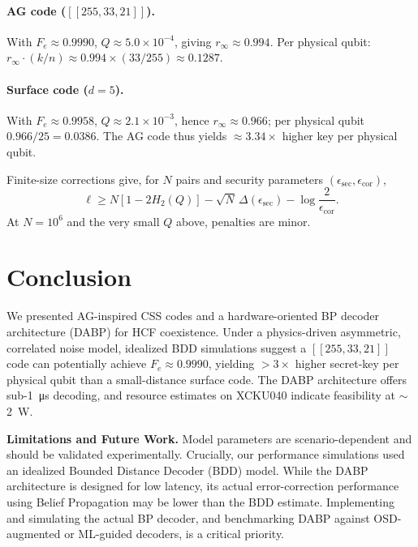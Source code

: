 \documentclass[conference]{IEEEtran}
\begin{document}
\paragraph*{AG code (\( [[255,33,21]] \)).}
With \(F_e\approx0.9990\), \(Q\approx5.0\times10^{-4}\), giving \(r_\infty\approx0.994\). Per physical qubit: \(r_\infty\cdot (k/n)\approx 0.994\times(33/255)\approx 0.1287\).

\paragraph*{Surface code (\(d=5\)).}
With \(F_e\approx0.9958\), \(Q\approx2.1\times10^{-3}\), hence \(r_\infty\approx0.966\); per physical qubit \(0.966/25=0.0386\). The AG code thus yields \(\approx3.34\times\) higher key per physical qubit.

Finite-size corrections give, for \(N\) pairs and security parameters \((\epsilon_{\mathrm{sec}},\epsilon_{\mathrm{cor}})\),
\begin{equation}
\ell \ge N\!\left[1-2H_2(Q)\right]-\sqrt{N}\,\Delta(\epsilon_{\mathrm{sec}})-\log\frac{2}{\epsilon_{\mathrm{cor}}}.
\end{equation}
At \(N=10^6\) and the very small \(Q\) above, penalties are minor.

\section{Conclusion}\label{sec:conclusion}
We presented AG-inspired CSS codes and a hardware-oriented BP decoder architecture (DABP) for HCF coexistence. Under a physics-driven asymmetric, correlated noise model, idealized BDD simulations suggest a \( [[255,33,21]] \) code can potentially achieve \(F_e\approx0.9990\), yielding \(>\!3\times\) higher secret-key per physical qubit than a small-distance surface code. The DABP architecture offers sub-\SI{1}{\micro\second} decoding, and resource estimates on XCKU040 indicate feasibility at \(\sim\)\SI{2}{\watt}.

\textbf{Limitations and Future Work.}
Model parameters are scenario-dependent and should be validated experimentally. Crucially, our performance simulations used an idealized Bounded Distance Decoder (BDD) model. While the DABP architecture is designed for low latency, its actual error-correction performance using Belief Propagation may be lower than the BDD estimate. Implementing and simulating the actual BP decoder, and benchmarking DABP against OSD-augmented or ML-guided decoders, is a critical priority.
\end{document}
